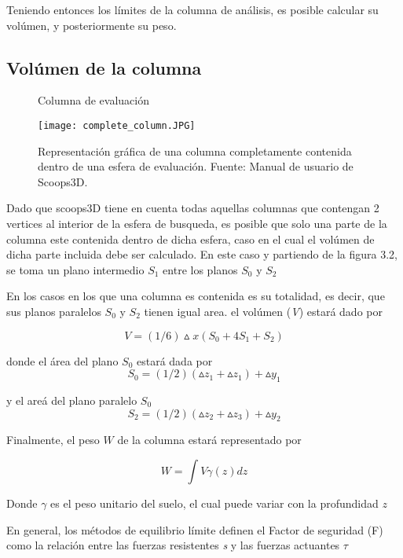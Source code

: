 Teniendo entonces los l\'imites de la columna de an\'alisis, es posible calcular su vol\'umen, y posteriormente su peso.

\subsection{Vol\'umen de la columna}



\begin{figure}[h]
\caption{Columna de evaluaci\'on}
\centering
\texttt{[image: complete\_column.JPG]}
\caption{Representaci\'on gr\'afica de una columna completamente contenida dentro de una esfera de evaluaci\'on. Fuente: Manual de usuario de Scoops3D.}
\label{fig:failure-plane}
\end{figure}

Dado que scoops3D tiene en cuenta todas aquellas columnas que contengan 2 vertices al interior de la esfera de busqueda, es posible que solo una parte de la columna este contenida dentro de dicha esfera, caso en el cual el vol\'umen de dicha parte incluida debe ser calculado.
En este caso y partiendo de la figura 3.2, se toma un plano intermedio $ S_{1} $ entre los planos $ S_{0} $ y $ S_{2} $

En los casos en los que una columna es contenida es su totalidad, es decir, que sus planos  paralelos $S_{0}$ y $S_{2}$ tienen igual area. el vol\'umen (\textit{V}) estar\'a dado por 

$$\textit{V}= (1/6)\vartriangle \textit{x}(S_{0} + 4S_{1} + S_{2})$$

donde el \'area del plano $\textit{S}_{0}$ estar\'a dada por
$$ \textit{S}_{0} = (1/2)(\vartriangle z_{1} +\vartriangle z_{1})+\vartriangle \textit{y}_{1}  $$

y el are\'a del plano paralelo $\textit{S}_{0}$
$$ \textit{S}_{2} = (1/2)(\vartriangle z_{2} +\vartriangle z_{3})+\vartriangle \textit{y}_{2}  $$

Finalmente, el peso $W$ de la columna estar\'a representado por

$$\textit{W} = \int \textit{V} \gamma (\textit{z}) \textit{dz} $$

Donde $ \gamma$ es el peso unitario del suelo, el cual puede variar con la profundidad $\textit{z}$

En general, los m\'etodos de equilibrio l\'imite definen el Factor de seguridad (F) como la relaci\'on entre las fuerzas resistentes  \textit{s} y las fuerzas actuantes $\tau$

